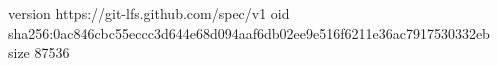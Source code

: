 version https://git-lfs.github.com/spec/v1
oid sha256:0ac846cbc55eccc3d644e68d094aaf6db02ee9e516f6211e36ac7917530332eb
size 87536
